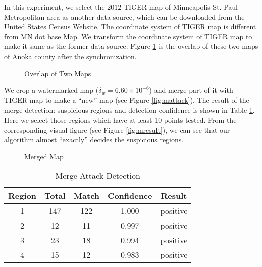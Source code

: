 In this experiment, we select the $2012$ TIGER map of Minneapolis-St. Paul 
Metropolitan area as another data source, which can be downloaded from the 
United States Census Website\cite{tigerurl}. The coordinate system of TIGER 
map is different from MN dot base Map. We transform the coordinate system of 
TIGER map to make it same as the former data source. Figure \ref{fig:17} is 
the overlap of these two maps of Anoka county after the synchronization. 


\begin{figure}[th]
\centering
{}
\caption{Overlap of Two Maps}
\label{fig:17}
\end{figure}
We crop a watermarked map ($\delta_w = 6.60 \times 10^{-6}$) and merge part of it with TIGER 
map to make a ``new'' map (see Figure \ref{fig:mattack}). The result of the 
merge detection: suspicious regions and detection confidence is shown in Table 
\ref{tab:merge}. Here we select those regions which have at least 10 points tested. 
From the corresponding visual figure (see Figure \ref{fig:mresult}), we can see 
that our algorithm almost ``exactly'' decides the suspicious regions. 

\begin{figure}[h]
\centering
{}
\caption{Merged Map}
\end{figure}



\begin{table}[th]
\centering
\caption{Merge Attack Detection}
\label{tab:merge}
\begin{tabular}{|c||c|c|c|c|} 
\hline
Region & Total & Match & Confidence & Result \\\hline \hline
1 & 147 & 122 & 1.000 & positive\\\hline
2 & 12 & 11 & 0.997 & positive\\\hline
3 & 23 & 18 & 0.994 & positive\\\hline
4 & 15 & 12 & 0.983 & positive\\\hline
\end{tabular}
\end{table}

